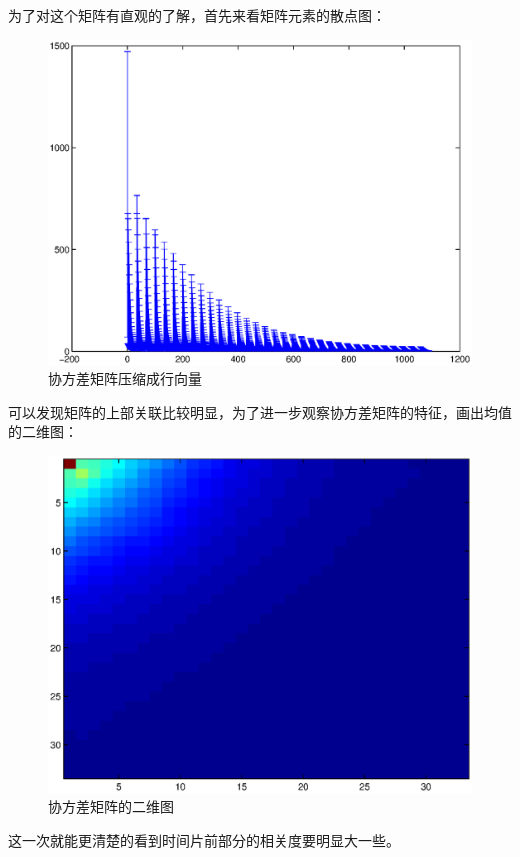 \documentclass[paper=a4, fontsize=11pt]{scrartcl} %
\numberwithin{equation}{section} %
\numberwithin{figure}{section} %
\numberwithin{table}{section} %
\begin{document}
\begin{CJK*}{UTF8}{gbsn}
为了对这个矩阵有直观的了解，首先来看矩阵元素的散点图：
\begin{figure}[H]
\centering
\includegraphics[width=140mm]{problem3_e_1.eps}
\caption{协方差矩阵压缩成行向量}
\end{figure}
可以发现矩阵的上部关联比较明显，为了进一步观察协方差矩阵的特征，画出均值的二维图：
\begin{figure}[H]
\centering
\includegraphics[width=140mm]{problem3_e_2.eps}
\caption{协方差矩阵的二维图}
\end{figure}
这一次就能更清楚的看到时间片前部分的相关度要明显大一些。
\\\\

\end{CJK*}
\end{document}
